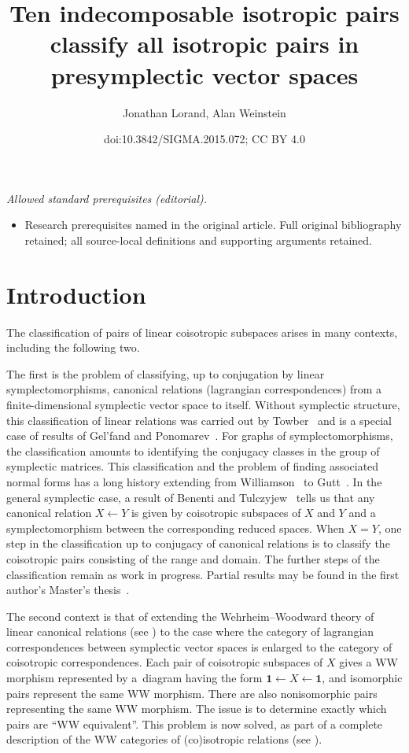 \documentclass[10pt,a4paper]{amsart}
\title{Ten indecomposable isotropic pairs classify all isotropic pairs in presymplectic vector spaces}
\author{Jonathan Lorand, Alan Weinstein}
\date{doi:10.3842/SIGMA.2015.072; CC BY 4.0}
\numberwithin{equation}{section}
\begin{document}
\maketitle
\noindent\textit{Allowed standard prerequisites (editorial).}\begin{itemize}
\item Research prerequisites named in the original article. Full original bibliography retained; all source-local definitions and supporting arguments retained.
\end{itemize}\medskip
\section{Introduction}

The classif\/ication of pairs of linear coisotropic subspaces arises in many contexts, including the following two.

The f\/irst is the problem of classifying, up to conjugation by linear symplectomorphisms, canonical relations (lagrangian correspondences) from a f\/inite-dimensional symplectic vector space to itself.   Without symplectic structure, this
classif\/ication of linear relations was carried out by Towber~\cite{Towber} and is a special case of results of Gel'fand and Ponomarev~\cite{Gelfand_Ponomarev}.  For graphs of symplectomorphisms, the classif\/ication amounts to identifying the conjugacy classes in the group of symplectic matrices. This classif\/ication and the problem of f\/inding associated normal forms has a long history extending from Williamson~\cite{Williamson} to Gutt~\cite{Gutt}. In the general symplectic case, a result of Benenti and Tulczyjew~\cite[Proposizioni~4.4 \&~4.5]{Benenti_Tulczyjew} tells us that any canonical relation $X\leftarrow Y$ is given by coisotropic subspaces of $X$ and $Y$ and a symplectomorphism between the corresponding reduced spaces.  When $X = Y$, one step in the classif\/ication up to conjugacy of canonical relations is to classify the coisotropic pairs consisting of  the range and domain. The further steps of the classif\/ication remain as work in progress.   Partial results may be found in the f\/irst author's
Master's thesis~\cite{Lorand}.

The second context is that of extending the Wehrheim--Woodward theory of linear canonical relations (see \cite{Li-Bland_Weinstein,Weinstein}) to the case where the category of lagrangian correspondences between symplectic vector spaces is enlarged to the category of coisotropic correspondences.  Each pair of coisotropic subspaces of $X$ gives a WW morphism represented by a~diagram having the form
${\mathbf 1} \leftarrow X \leftarrow {\mathbf 1}$, and isomorphic pairs represent the same WW morphism. There are also nonisomorphic pairs representing the same WW morphism. The issue is to determine exactly which pairs are ``WW equivalent''.   This problem is now solved, as part of a complete description of the WW categories of (co)isotropic relations (see \cite{Weinstein2}).
\end{document}
